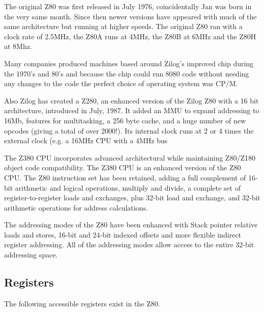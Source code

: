 \documentclass[12pt,twoside,openright,a4paper]{book}
\begin{document}
The original Z80 was first released in July 1976, coincidentally Jan was born in the very same month. Since then newer versions have appeared with much of the same architecture but running at higher speeds. The original Z80 ran with a clock rate of 2.5MHz, the Z80A runs at 4MHz, the Z80B at 6MHz and the Z80H at 8Mhz. 

Many companies produced machines based around Zilog's improved chip during the 1970's and 80's and because the chip could run 8080 code without needing any changes to the code the perfect choice of operating system was CP/M. 

Also Zilog has created a Z280, an enhanced version of the Zilog Z80 with a 16 bit architecture, introduced in July, 1987. It added an MMU to expand addressing to 16Mb, features for multitasking, a 256 byte cache, and a huge number of new opcodes (giving a total of over 2000!). Its internal clock runs at 2 or 4 times the external clock (e.g. a 16MHz CPU with a 4MHz bus

The Z380 CPU incorporates advanced architectural while maintaining Z80/Z180 object code compatibility. The Z380 CPU is an enhanced version of the Z80 CPU. The Z80 instruction set has been retained, adding a full complement of 16-bit arithmetic and logical operations, multiply and divide, a complete set of register-to-register loads and exchanges, plus 32-bit load and exchange, and 32-bit arithmetic operations for address calculations.

The addressing modes of the Z80 have been enhanced with Stack pointer relative loads and stores, 16-bit and 24-bit indexed offsets and more flexible indirect register addressing. All of the addressing modes allow access to the entire 32-bit addressing space.


\subsection{Registers}

The following accessible registers exist in the Z80.

\newcommand{\RegDesc}[2]{\rdelim\}{#1}{1ex}[#2]}
\end{document}
